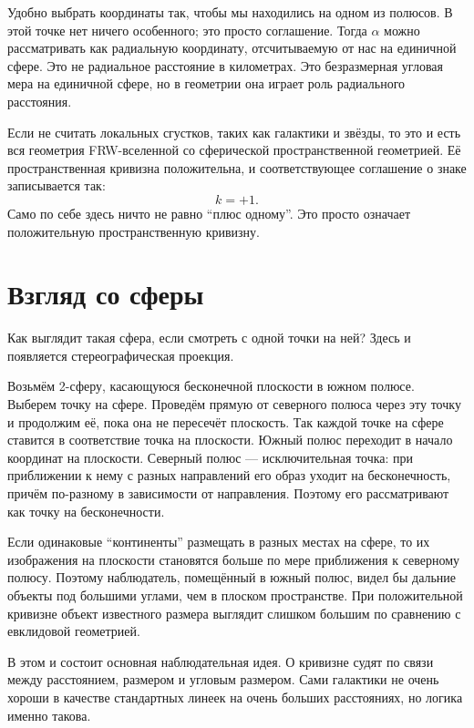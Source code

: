 Удобно выбрать координаты так, чтобы мы находились на одном из полюсов. В этой точке нет ничего особенного; это просто соглашение. Тогда \(\alpha\) можно рассматривать как радиальную координату, отсчитываемую от нас на единичной сфере. Это не радиальное расстояние в километрах. Это безразмерная угловая мера на единичной сфере, но в геометрии она играет роль радиального расстояния.

Если не считать локальных сгустков, таких как галактики и звёзды, то это и есть вся геометрия FRW-вселенной со сферической пространственной геометрией. Её пространственная кривизна положительна, и соответствующее соглашение о знаке записывается так:
\begin{equation}
k=+1.
\end{equation}
Само по себе здесь ничто не равно ``плюс одному''. Это просто означает положительную пространственную кривизну.

\section{Взгляд со сферы}

Как выглядит такая сфера, если смотреть с одной точки на ней? Здесь и появляется стереографическая проекция.

Возьмём 2-сферу, касающуюся бесконечной плоскости в южном полюсе. Выберем точку на сфере. Проведём прямую от северного полюса через эту точку и продолжим её, пока она не пересечёт плоскость. Так каждой точке на сфере ставится в соответствие точка на плоскости. Южный полюс переходит в начало координат на плоскости. Северный полюс — исключительная точка: при приближении к нему с разных направлений его образ уходит на бесконечность, причём по-разному в зависимости от направления. Поэтому его рассматривают как точку на бесконечности.

Если одинаковые ``континенты'' размещать в разных местах на сфере, то их изображения на плоскости становятся больше по мере приближения к северному полюсу. Поэтому наблюдатель, помещённый в южный полюс, видел бы дальние объекты под большими углами, чем в плоском пространстве. При положительной кривизне объект известного размера выглядит слишком большим по сравнению с евклидовой геометрией.

В этом и состоит основная наблюдательная идея. О кривизне судят по связи между расстоянием, размером и угловым размером. Сами галактики не очень хороши в качестве стандартных линеек на очень больших расстояниях, но логика именно такова.

